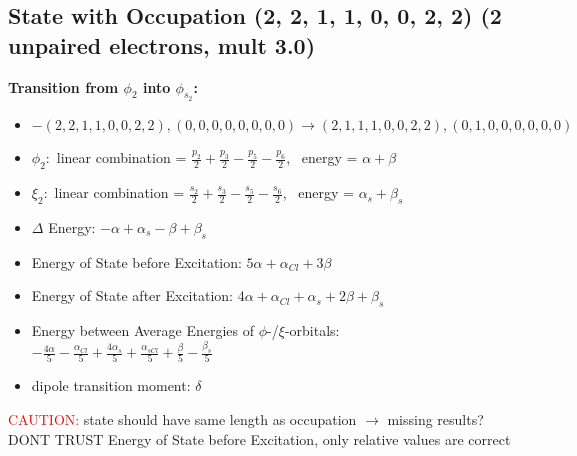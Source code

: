 \documentclass[12pt,a4paper]{article}
\begin{document}
\subsection*{State with Occupation (2, 2, 1, 1, 0, 0, 2, 2) (2 unpaired electrons, mult 3.0)}
        \noindent\textbf{Transition from $\phi_{2}$ into $\phi_{s_{2}}$:}
        \begin{itemize}
            \item $- (2, 2, 1, 1, 0, 0, 2, 2), (0, 0, 0, 0, 0, 0, 0, 0) \rightarrow (2, 1, 1, 1, 0, 0, 2, 2), (0, 1, 0, 0, 0, 0, 0, 0)$
        
            \item $\phi_{2}:$ linear combination = $\frac{p_{2}}{2} + \frac{p_{3}}{2} - \frac{p_{5}}{2} - \frac{p_{6}}{2}$, \
            energy = $\alpha + \beta$
            
            \item $\xi_{2}:$ linear combination = $\frac{s_{2}}{2} + \frac{s_{3}}{2} - \frac{s_{5}}{2} - \frac{s_{6}}{2}$, \
            energy = $\alpha_{s} + \beta_{s}$
            
            \item $\Delta$ Energy: $- \alpha + \alpha_{s} - \beta + \beta_{s}$
            \item Energy of State before Excitation: $5 \alpha + \alpha_{Cl} + 3 \beta$
            \item Energy of State after Excitation: $4 \alpha + \alpha_{Cl} + \alpha_{s} + 2 \beta + \beta_{s}$
            \item Energy between Average Energies of $\phi$-/$\xi$-orbitals: \
            $- \frac{4 \alpha}{5} - \frac{\alpha_{Cl}}{5} + \frac{4 \alpha_{s}}{5} + \frac{\alpha_{s Cl}}{5} + \frac{\beta}{5} - \frac{\beta_{s}}{5}$
        
            \item dipole transition moment: $\delta$
        
        \end{itemize}
        
	\textcolor{red}{CAUTION:} state should have same length as occupation $\rightarrow$ missing results?
	DONT TRUST \glqq{}Energy of State before Excitation\grqq{}, only relative values are correct
\end{document}
